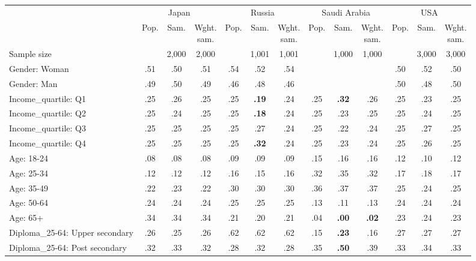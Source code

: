 
\begin{tabular}[t]{lcccccccccccc}
\toprule
\multicolumn{1}{c}{} & \multicolumn{3}{c}{Japan} & \multicolumn{3}{c}{Russia} & \multicolumn{3}{c}{Saudi Arabia} & \multicolumn{3}{c}{USA} \\
\cmidrule(l{3pt}r{3pt}){2-4} \cmidrule(l{3pt}r{3pt}){5-7} \cmidrule(l{3pt}r{3pt}){8-10} \cmidrule(l{3pt}r{3pt}){11-13}
  & Pop. & Sam. & \makecell{Wght.\\sam.} & Pop. & Sam. & \makecell{Wght.\\sam.} & Pop. & Sam. & \makecell{Wght.\\sam.} & Pop. & Sam. & \makecell{Wght.\\sam.}\\
\midrule
Sample size &  & 2,000 & 2,000 &  & 1,001 & 1,001 &  & 1,000 & 1,000 &  & 3,000 & 3,000\\
\addlinespace
Gender: Woman & .51 & .50 & .51 & .54 & .52 & .54 &  &  &  & .50 & .52 & .50\\
Gender: Man & .49 & .50 & .49 & .46 & .48 & .46 &  &  &  & .50 & .48 & .50\\
\addlinespace
Income\_quartile: Q1 & .25 & .26 & .25 & .25 & \textbf{.19} & .24 & .25 & \textbf{.32} & .26 & .25 & .23 & .25\\
Income\_quartile: Q2 & .25 & .24 & .25 & .25 & \textbf{.18} & .24 & .25 & .23 & .25 & .25 & .24 & .25\\
Income\_quartile: Q3 & .25 & .25 & .25 & .25 & .27 & .24 & .25 & .22 & .24 & .25 & .27 & .25\\
Income\_quartile: Q4 & .25 & .25 & .25 & .25 & \textbf{.32} & .24 & .25 & .23 & .24 & .25 & .26 & .25\\
\addlinespace
Age: 18-24 & .08 & .08 & .08 & .09 & .09 & .09 & .15 & .16 & .16 & .12 & .10 & .12\\
Age: 25-34 & .12 & .12 & .12 & .16 & .15 & .16 & .32 & .35 & .32 & .17 & .18 & .17\\
Age: 35-49 & .22 & .23 & .22 & .30 & .30 & .30 & .36 & .37 & .37 & .25 & .24 & .25\\
Age: 50-64 & .24 & .24 & .24 & .25 & .25 & .25 & .13 & .11 & .13 & .24 & .24 & .24\\
Age: 65+ & .34 & .34 & .34 & .21 & .20 & .21 & .04 & \textbf{.00} & \textbf{.02} & .23 & .24 & .23\\
\addlinespace
Diploma\_25-64: Upper secondary & .26 & .25 & .26 & .62 & .62 & .62 & .15 & \textbf{.23} & .16 & .27 & .27 & .27\\
Diploma\_25-64: Post secondary & .32 & .33 & .32 & .28 & .32 & .28 & .35 & \textbf{.50} & .39 & .33 & .34 & .33\\

\end{tabular}
